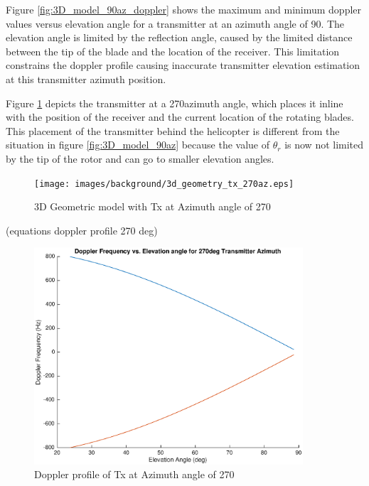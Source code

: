 Figure \ref{fig:3D_model_90az_doppler} shows the maximum and minimum doppler values versus elevation angle for a transmitter at an azimuth angle of 90\textdegree. The elevation angle is limited by the reflection angle, caused by the limited distance between the tip of the blade and the location of the receiver. This limitation constrains the doppler profile causing inaccurate transmitter elevation estimation at this transmitter azimuth position.

Figure \ref{fig:3D_model_270az} depicts the transmitter at a 270\textdegree \space azimuth angle, which places it inline with the position of the receiver and the current location of the rotating blades. This placement of the transmitter behind the helicopter is different from the situation in figure \ref{fig:3D_model_90az} because the value of $\theta_r$ is now not limited by the tip of the rotor and can go to smaller elevation angles.

\begin{figure}
	\begin{center}
		\texttt{[image: images/background/3d\_geometry\_tx\_270az.eps]}
		\caption{3D Geometric model with Tx at Azimuth angle of 270\textdegree}
		\label{fig:3D_model_270az}
	\end{center}
\end{figure}

(equations doppler profile 270 deg)

\begin{figure}
	\begin{center}
		\includegraphics[width=10cm]{images/background/3d_geometry_tx_270az_doppler_profile.eps}
		\caption{Doppler profile of Tx at Azimuth angle of 270\textdegree}
		\label{fig:3D_model_270az_doppler}
	\end{center}
\end{figure}

